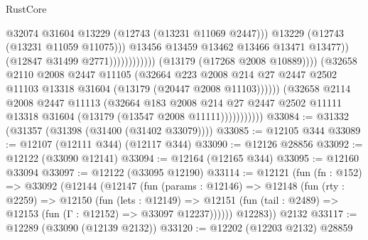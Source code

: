 \begin{lexlean}{RustCore}
\begin{coremodule}
                                                        @32074
                                                        @31604
                                                        @13229
                                                        (@12743 (@13231 @11069 @2447)))
                                                      @13229
                                                      (@12743 (@13231 @11059 @11075)))
                                                    @13456
                                                    @13459
                                                    @13462
                                                    @13466
                                                    @13471
                                                    @13477))
                                                (@12847 @31499 @2771))))))))))))
                          (@13179 (@17268 @2008 @10889))))
                      (@32658
                        @2110
                        @2008
                        @2447
                        @11105
                        (@32664
                          @223
                          @2008
                          @214
                          @27
                          @2447
                          @2502
                          @11103
                          @13318
                          @31604
                          (@13179 (@20447 @2008 @11103))))))
                  (@32658
                    @2114
                    @2008
                    @2447
                    @11113
                    (@32664
                      @183
                      @2008
                      @214
                      @27
                      @2447
                      @2502
                      @11111
                      @13318
                      @31604
                      (@13179 (@13547 @2008 @11111)))))))))))
@33084 := @31332 (@31357 (@31398 (@31400 (@31402 @33079))))
@33085 := @12105 @344
@33089 := @12107 (@12111 @344) (@12117 @344)
@33090 := @12126 @28856
@33092 := @12122 (@33090 @12141)
@33094 := @12164 (@12165 @344)
@33095 := @12160 @33094
@33097 := @12122 (@33095 @12190)
@33114 := @12121
    (fun (fn : @152) =>
    @33092
      (@12144
        (@12147
          (fun (params : @12146) =>
          @12148
            (fun (rty : @2259) =>
            @12150
              (fun (lets : @12149) =>
              @12151 (fun (tail : @2489) => @12153 (fun (Γ : @12152) => @33097 @12237))))))
        @12283))
    @2132
@33117 := @12289 (@33090 (@12139 @2132))
@33120 := @12202 (@12203 @2132) @28859

\end{coremodule}
\end{lexlean}
